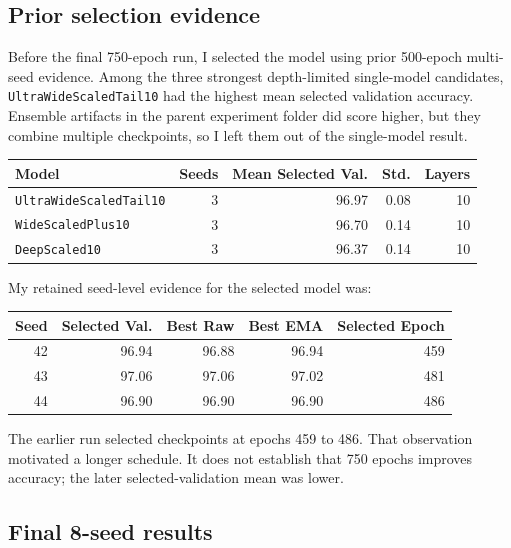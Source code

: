 \documentclass[11pt]{article}
\begin{document}
\subsection{Prior selection evidence}

Before the final 750-epoch run, I selected the model using prior 500-epoch
multi-seed evidence. Among the three strongest depth-limited single-model candidates,
\texttt{UltraWideScaledTail10} had the highest mean selected validation accuracy.
Ensemble artifacts in the parent experiment folder did score higher, but they combine
multiple checkpoints, so I left them out of the single-model result.

\begin{center}
\begin{tabular}{lrrrr}
\toprule
\textbf{Model} & \textbf{Seeds} & \textbf{Mean Selected Val.} & \textbf{Std.} & \textbf{Layers} \\
\midrule
\texttt{UltraWideScaledTail10} & 3 & 96.97 & 0.08 & 10 \\
\texttt{WideScaledPlus10} & 3 & 96.70 & 0.14 & 10 \\
\texttt{DeepScaled10} & 3 & 96.37 & 0.14 & 10 \\
\bottomrule
\end{tabular}
\end{center}

My retained seed-level evidence for the selected model was:

\begin{center}
\begin{tabular}{rrrrr}
\toprule
\textbf{Seed} & \textbf{Selected Val.} & \textbf{Best Raw} & \textbf{Best EMA} & \textbf{Selected Epoch} \\
\midrule
42 & 96.94 & 96.88 & 96.94 & 459 \\
43 & 97.06 & 97.06 & 97.02 & 481 \\
44 & 96.90 & 96.90 & 96.90 & 486 \\
\bottomrule
\end{tabular}
\end{center}

The earlier run selected checkpoints at epochs 459 to 486. That observation motivated a longer schedule. It does not establish that 750 epochs improves accuracy; the later selected-validation mean was lower.

\subsection{Final 8-seed results}
\end{document}

